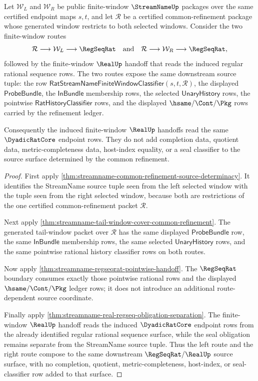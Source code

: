 \begin{theorem}
\label{thm:streamname-common-refinement-source-confluence}
Let $\mathcal W_L$ and $\mathcal W_R$ be public finite-window
$\StreamNameUp$ packages over the same certified endpoint maps $s,t$, and let
$\mathcal R$ be a certified common-refinement package whose generated window
restricts to both selected windows. Consider the two finite-window routes
$$
\mathcal R\longrightarrow \mathcal W_L\longrightarrow \RegSeqRat
\quad\text{and}\quad
\mathcal R\longrightarrow \mathcal W_R\longrightarrow \RegSeqRat,
$$
followed by the finite-window $\RealUp$ handoff that reads the induced
regular rational sequence rows. The two routes expose the same downstream
source tuple: the row
$\mathsf{RatStreamNameFiniteWindowClassifier}(s,t,\mathcal R)$, the displayed
$\mathsf{ProbeBundle}$, the $\mathsf{InBundle}$ membership rows, the selected
$\mathsf{UnaryHistory}$ rows, the pointwise
$\mathsf{RatHistoryClassifier}$ rows, and the displayed
$\hsame/\Cont/\Pkg$ rows carried by the refinement ledger.

Consequently the induced finite-window $\RealUp$ handoffs read the same
$\DyadicRatCore$ endpoint rows. They do not add completion data, quotient
data, metric-completeness data, host-index equality, or a seal classifier to
the source surface determined by the common refinement.
\end{theorem}
\begin{proof}
First apply
\autoref{thm:streamname-common-refinement-source-determinacy}. It identifies
the StreamName source tuple seen from the left selected window with the tuple
seen from the right selected window, because both are restrictions of the one
certified common-refinement packet $\mathcal R$.

Next apply
\autoref{thm:streamname-tail-window-cover-common-refinement}. The generated
tail-window packet over $\mathcal R$ has the same displayed
$\mathsf{ProbeBundle}$ row, the same $\mathsf{InBundle}$ membership rows, the
same selected $\mathsf{UnaryHistory}$ rows, and the same pointwise rational
history classifier rows on both routes.

Now apply \autoref{thm:streamname-regseqrat-pointwise-handoff}. The
$\RegSeqRat$ boundary consumes exactly those pointwise rational rows and the
displayed $\hsame/\Cont/\Pkg$ ledger rows; it does not introduce an additional
route-dependent source coordinate.

Finally apply \autoref{thm:streamname-real-regseq-obligation-separation}. The
finite-window $\RealUp$ handoff reads the induced $\DyadicRatCore$ endpoint
rows from the already identified regular rational sequence surface, while the
seal obligation remains separate from the StreamName source tuple. Thus the
left route and the right route compose to the same downstream
$\RegSeqRat/\RealUp$ source surface, with no completion, quotient,
metric-completeness, host-index, or seal-classifier row added to that surface.
\end{proof}

